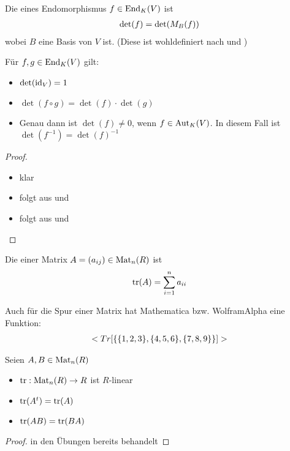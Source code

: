 \begin{definition}
	Die  eines Endomorphismus $f\in \End_K(V)$ ist 
	\begin{align}
		\det(f)=\det(M_B(f))\notag
	\end{align}
	wobei $B$ eine Basis von $V$ ist. (Diese ist wohldefiniert nach  und )
\end{definition}

\begin{proposition}
	Für $f,g\in \End_K(V)$ gilt:
	\begin{itemize}
		\item $\det(\id_V)=1$
		\item $\det(f\circ g)=\det(f)\cdot \det(g)$
		\item Genau dann ist $\det(f)\neq 0$, wenn $f\in \Aut_K(V)$. In diesem Fall ist $\det(f^{-1})=\det(f)^{-1}$
	\end{itemize}
\end{proposition}
\begin{proof}
	\begin{itemize}
		\item klar
		\item folgt aus  und 
		\item folgt aus  und 
	\end{itemize}
\end{proof}

\begin{definition}
	Die  einer Matrix $A=(a_{ij})\in \Mat_n(R)$ ist 
	\begin{align}
		\tr(A)=\sum_{i=1}^n a_{ii}\notag
	\end{align}
\end{definition}

\begin{mathematica}
	Auch für die Spur einer Matrix hat Mathematica bzw. WolframAlpha eine Funktion:
	\begin{align}
		\texttt{Tr[\{\{1, 2, 3\}, \{4, 5, 6\}, \{7, 8, 9\}\}]}\notag
	\end{align}
\end{mathematica}

\begin{lemma}
	Seien $A,B\in \Mat_n(R)$
	\begin{itemize}
		\item $\tr: \Mat_n(R)\to R$ ist $R$-linear
		\item $\tr(A^t)=\tr(A)$
		\item $\tr(AB)=\tr(BA)$
	\end{itemize}
\end{lemma}
\begin{proof}
	in den Übungen bereits behandelt
\end{proof}

